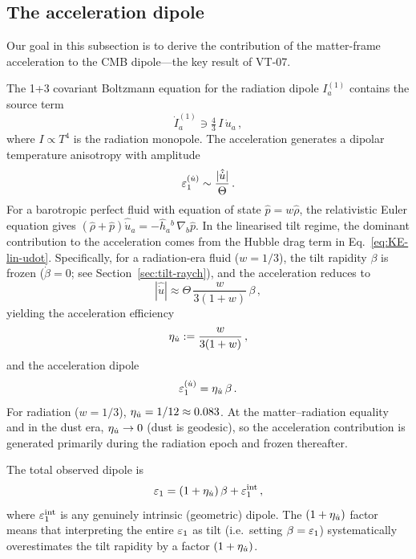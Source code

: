 \subsection{The acceleration dipole}\label{sec:accel-dipole}

Our goal in this subsection is to derive the contribution of
the matter-frame acceleration to the CMB dipole---the key
result of VT-07.

The 1+3 covariant Boltzmann equation for the radiation dipole
$I_a^{(1)}$ contains the source
term~\cite{MaartensGE1999,ChallinorLasenby1999}
\begin{equation}\label{eq:boltz-dipole}
\dot{I}_a^{(1)} \ni \tfrac{4}{3}\,I\,\dot{u}_a\,,
\end{equation}
where $I \propto T^4$ is the radiation monopole.  The
acceleration generates a dipolar temperature anisotropy with
amplitude
\begin{equation}\label{eq:eps1-udot-raw}
\varepsilon_1^{(\dot{u})}
\sim \frac{|\hat{\dot{u}}|}{\Theta}\,.
\end{equation}
For a barotropic perfect fluid with equation of state
$\hat{p} = w\hat{\rho}$, the relativistic Euler equation gives
$(\hat{\rho} + \hat{p})\hat{\dot{u}}_a
= -\hat{h}_a{}^b\,\nabla_b \hat{p}$.
In the linearised tilt regime, the dominant contribution
to the acceleration comes from the Hubble drag term in
Eq.~\eqref{eq:KE-lin-udot}.  Specifically, for a radiation-era
fluid ($w = 1/3$), the tilt rapidity $\beta$ is frozen
($\dot{\beta} = 0$; see Section~\ref{sec:tilt-raych}), and
the acceleration reduces to
\begin{equation}
|\hat{\dot{u}}| \approx \Theta\,
  \frac{w}{3(1+w)}\,\beta\,,
\end{equation}
yielding the acceleration efficiency
\begin{equation}\label{eq:eta-udot}
\eta_{\dot{u}} := \frac{w}{3(1+w)}\,,
\end{equation}
and the acceleration dipole
\begin{equation}\label{eq:eps1-udot}
\varepsilon_1^{(\dot{u})} = \eta_{\dot{u}}\,\beta\,.
\end{equation}
For radiation ($w = 1/3$), $\eta_{\dot{u}} = 1/12 \approx 0.083$.
At the matter--radiation equality and in the dust era,
$\eta_{\dot{u}} \to 0$ (dust is geodesic), so the acceleration
contribution is generated primarily during the radiation epoch
and frozen thereafter.

The total observed dipole is
\begin{equation}\label{eq:eps1-total}
\varepsilon_1 = (1 + \eta_{\dot{u}})\,\beta + \varepsilon_1^{\mathrm{int}}\,,
\end{equation}
where $\varepsilon_1^{\mathrm{int}}$ is any genuinely intrinsic
(geometric) dipole.  The $(1 + \eta_{\dot{u}})$ factor means that
interpreting the entire $\varepsilon_1$ as tilt (i.e.\ setting
$\beta = \varepsilon_1$) systematically overestimates the tilt
rapidity by a factor $(1 + \eta_{\dot{u}})$.


